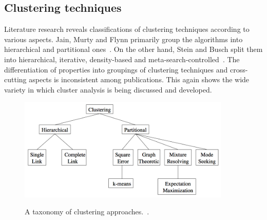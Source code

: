 \subsection{Clustering techniques}
\label{chapter:clustering-techniques}

Literature research reveals classifications of clustering techniques according to various aspects. Jain, Murty and Flynn primarily group the algorithms into hierarchical and partitional ones~\cite{Jain99clusterreview}. On the other hand, Stein and Busch split them into hierarchical, iterative, density-based and meta-search-controlled~\cite{Stein05density}. The differentiation of properties into groupings of clustering techniques and cross-cutting aspects is inconsistent among publications. This again shows the wide variety in which cluster analysis is being discussed and developed.

\begin{figure}[h]
  \begin{center}
    \includegraphics[width=0.9\textwidth]{figures/clustering_approaches_jain.png}
    \label{fig:clusters}
    \caption{A taxonomy of clustering approaches.~\cite[p 275]{Jain99clusterreview}.}
  \end{center}
\end{figure}

